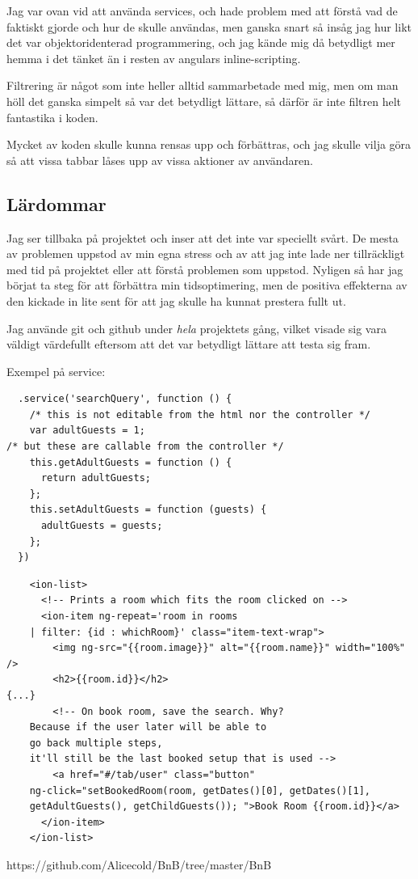 \documentclass[a4paper]{article}
\begin{document}
Jag var ovan vid att använda services, och hade problem med att förstå vad de faktiskt gjorde och hur de skulle användas, men ganska snart så insåg jag hur likt det var objektoridenterad programmering, och jag kände mig då betydligt mer hemma i det tänket än i resten av angulars inline-scripting.

Filtrering är något som inte heller alltid sammarbetade med mig, men om man höll det ganska simpelt så var det betydligt lättare, så därför är inte filtren helt fantastika i koden.

Mycket av koden skulle kunna rensas upp och förbättras, och jag skulle vilja göra så att vissa tabbar låses upp av vissa aktioner av användaren.

\subsection{Lärdommar}
Jag ser tillbaka på projektet och inser att det inte var speciellt svårt. De mesta av problemen uppstod av min egna stress och av att jag inte lade ner tillräckligt med tid på projektet eller att förstå problemen som uppstod. Nyligen så har jag börjat ta steg för att förbättra min tidsoptimering, men de positiva effekterna av den kickade in lite sent för att jag skulle ha kunnat prestera fullt ut.

Jag använde git och github under \emph{hela} projektets gång, vilket visade sig vara väldigt värdefullt eftersom att det var betydligt lättare att testa sig fram.



\begin{thebibliography}{9}


Exempel på service:
\begin{lstlisting}
  .service('searchQuery', function () {
	/* this is not editable from the html nor the controller */
    var adultGuests = 1; 
/* but these are callable from the controller */
    this.getAdultGuests = function () {
      return adultGuests;
    };
    this.setAdultGuests = function (guests) {
      adultGuests = guests;
    };
  })
\end{lstlisting}

\begin{lstlisting}
    <ion-list>
      <!-- Prints a room which fits the room clicked on -->
      <ion-item ng-repeat='room in rooms
	| filter: {id : whichRoom}' class="item-text-wrap">
        <img ng-src="{{room.image}}" alt="{{room.name}}" width="100%" />
        <h2>{{room.id}}</h2>
{...}
        <!-- On book room, save the search. Why?
	Because if the user later will be able to
	go back multiple steps,
	it'll still be the last booked setup that is used -->
        <a href="#/tab/user" class="button"
	ng-click="setBookedRoom(room, getDates()[0], getDates()[1],
	getAdultGuests(), getChildGuests()); ">Book Room {{room.id}}</a>
      </ion-item>
    </ion-list>
\end{lstlisting}

  https://github.com/Alicecold/BnB/tree/master/BnB

\end{thebibliography}
\end{document}
